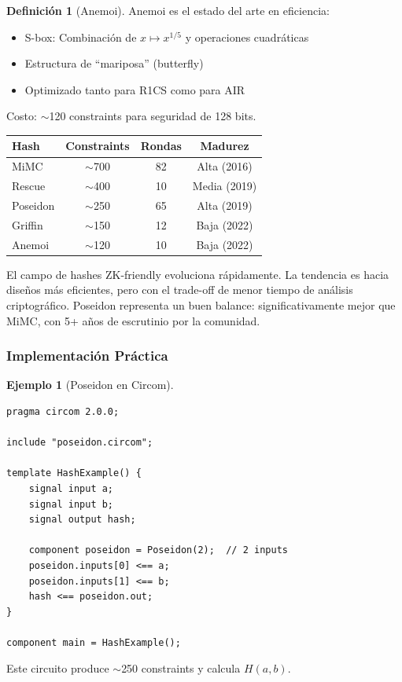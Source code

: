 \documentclass[11pt,a4paper,twoside,openright]{book}
\theoremstyle{definition}
\newtheorem{definition}{Definición}[chapter]
\newtheorem{example}{Ejemplo}[chapter]
\theoremstyle{plain}
\theoremstyle{remark}
\begin{document}
\begin{definition}[Anemoi]
Anemoi es el estado del arte en eficiencia:
\begin{itemize}
    \item S-box: Combinación de $x \mapsto x^{1/5}$ y operaciones cuadráticas
    \item Estructura de ``mariposa'' (butterfly)
    \item Optimizado tanto para R1CS como para AIR
\end{itemize}

Costo: $\sim$120 constraints para seguridad de 128 bits.
\end{definition}

\begin{center}
\begin{tabular}{lccc}
\toprule
\textbf{Hash} & \textbf{Constraints} & \textbf{Rondas} & \textbf{Madurez} \\
\midrule
MiMC & $\sim$700 & 82 & Alta (2016) \\
Rescue & $\sim$400 & 10 & Media (2019) \\
Poseidon & $\sim$250 & 65 & Alta (2019) \\
Griffin & $\sim$150 & 12 & Baja (2022) \\
Anemoi & $\sim$120 & 10 & Baja (2022) \\
\bottomrule
\end{tabular}
\end{center}

\begin{intuicion}
El campo de hashes ZK-friendly evoluciona rápidamente. La tendencia es hacia diseños más eficientes, pero con el trade-off de menor tiempo de análisis criptográfico. Poseidon representa un buen balance: significativamente mejor que MiMC, con 5+ años de escrutinio por la comunidad.
\end{intuicion}

\subsubsection{Implementación Práctica}

\begin{example}[Poseidon en Circom]
\begin{verbatim}
pragma circom 2.0.0;

include "poseidon.circom";

template HashExample() {
    signal input a;
    signal input b;
    signal output hash;
    
    component poseidon = Poseidon(2);  // 2 inputs
    poseidon.inputs[0] <== a;
    poseidon.inputs[1] <== b;
    hash <== poseidon.out;
}

component main = HashExample();
\end{verbatim}

Este circuito produce $\sim$250 constraints y calcula $H(a, b)$.
\end{example}
\end{document}
